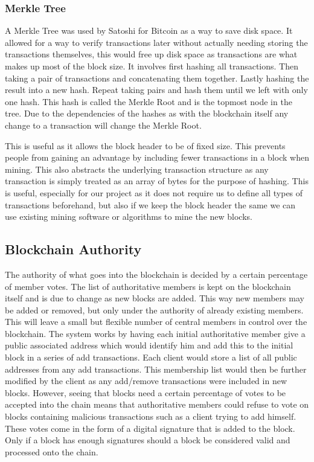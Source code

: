 \documentclass[11pt]{article}
\begin{document}
\subsubsection{Merkle Tree}\label{subsubsec:merkle_tree}
A Merkle Tree was used by Satoshi for Bitcoin as a way to save disk space. It allowed for a way to verify transactions later without actually needing storing the transactions themselves, this would free up disk space as transactions are what makes up most of the block size. It involves first hashing all transactions. Then taking a pair of transactions and concatenating them together. Lastly hashing the result into a new hash. Repeat taking pairs and hash them until we left with only one hash. This hash is called the Merkle Root and is the topmost node in the tree. Due to the dependencies of the hashes as with the blockchain itself any change to a transaction will change the Merkle Root.


This is useful as it allows the block header to be of fixed size. This prevents people from gaining an advantage by including fewer transactions in a block when mining. This also abstracts the underlying transaction structure as any transaction is simply treated as an array of bytes for the purpose of hashing. This is useful, especially for our project as it does not require us to define all types of transactions beforehand, but also if we keep the block header the same we can use existing mining software or algorithms to mine the new blocks.

\subsection{Blockchain Authority}\label{subsec:authority}

The authority of what goes into the blockchain is decided by a certain percentage of member votes. The list of authoritative members is kept on the blockchain itself and is due to change as new blocks are added. This way new members may be added or removed, but only under the authority of already existing members. This will leave a small but flexible number of central members in control over the blockchain. The system works by having each initial authoritative member give a public associated address which would identify him and add this to the initial block in a series of add transactions. Each client would store a list of all public addresses from any add transactions. This membership list would then be further modified by the client as any add/remove transactions were included in new blocks. However, seeing that blocks need a certain percentage of votes to be accepted into the chain means that authoritative members could refuse to vote on blocks containing malicious transactions such as a client trying to add himself. These votes come in the form of a digital signature that is added to the block. Only if a block has enough signatures should a block be considered valid and processed onto the chain. 
\end{document}
